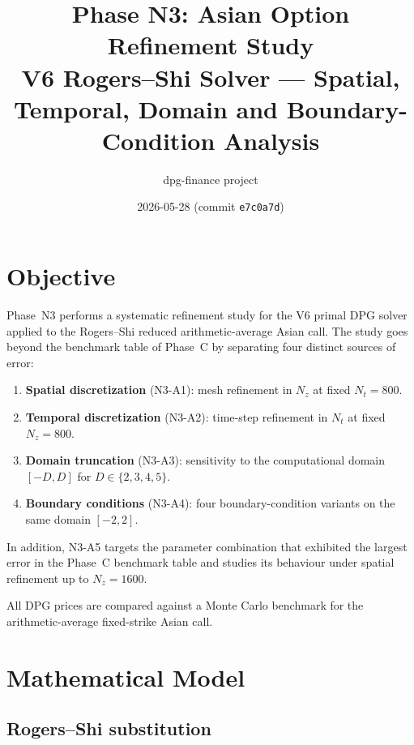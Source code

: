 \documentclass[11pt,a4paper]{article}
\title{\textbf{Phase N3: Asian Option Refinement Study}\\
       \large V6 Rogers--Shi Solver --- Spatial, Temporal, Domain
       and Boundary-Condition Analysis}
\author{dpg-finance project}
\date{2026-05-28 \quad (commit \texttt{e7c0a7d})}
\newcommand{\Nz}{N_z}
\newcommand{\Nt}{N_t}
\begin{document}
\maketitle
\tableofcontents
\bigskip

\section{Objective}

Phase~N3 performs a systematic refinement study for the V6 primal DPG
solver applied to the Rogers--Shi reduced arithmetic-average Asian call.
The study goes beyond the benchmark table of Phase~C by separating four
distinct sources of error:

\begin{enumerate}[noitemsep]
  \item \textbf{Spatial discretization} (N3-A1): mesh refinement in $\Nz$
        at fixed $\Nt = 800$.
  \item \textbf{Temporal discretization} (N3-A2): time-step refinement in
        $\Nt$ at fixed $\Nz = 800$.
  \item \textbf{Domain truncation} (N3-A3): sensitivity to the computational
        domain $[-D,D]$ for $D \in \{2,3,4,5\}$.
  \item \textbf{Boundary conditions} (N3-A4): four boundary-condition
        variants on the same domain $[-2,2]$.
\end{enumerate}
In addition, N3-A5 targets the parameter combination that exhibited the
largest error in the Phase~C benchmark table and studies its behaviour
under spatial refinement up to $\Nz = 1600$.

All DPG prices are compared against a Monte Carlo benchmark for the
arithmetic-average fixed-strike Asian call.

\section{Mathematical Model}

\subsection{Rogers--Shi substitution}
\end{document}
